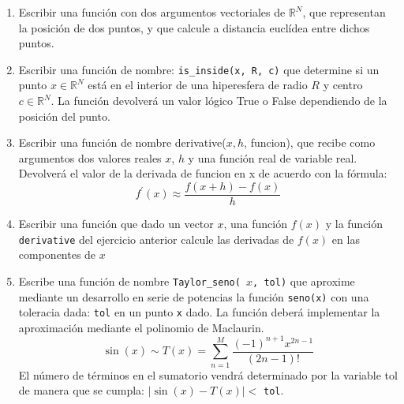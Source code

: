 \documentclass[12pt]{article}
\begin{document}
\begin{enumerate}
\item Escribir una función con dos argumentos vectoriales de $\mathbb{R}^{N}$, que representan la posición 
de dos puntos, y que calcule a distancia euclídea entre dichos puntos.  
	
	
\item Escribir una función de nombre: \texttt{is\_inside(x, R, c)} que determine si un punto $ x \in \mathbb{R}^{N} $ 
está en el interior de una hiperesfera de radio $ R $ y centro $ c \in \mathbb{R}^{N}  $.
La función devolverá un valor lógico True o False dependiendo de la posición del punto.
	
\item Escribir una función de nombre derivative($x, h$, funcion), 
que recibe como argumentos dos valores reales $x$, $h$ y una función real de variable real. 
Devolverá el valor de la derivada de funcion en x de acuerdo con la fórmula:	
	$$
	f^{\prime}(x) \approx \frac{ f(x+h)-f(x) } { h }
	$$
	
	
\item Escribir una función que dado un vector $ x $, una función $ f(x)$ y la función 
\texttt{derivative} del ejercicio anterior calcule las derivadas de $ f(x) $ en las componentes de  $ x $ 

		









\item Escribe una función de nombre \texttt{Taylor\_seno( $x$, tol)} 
que aproxime 
mediante un desarrollo en serie de potencias la función \texttt{seno(x)} 
con una toleracia dada: \texttt{tol} en un punto \texttt{x} dado.  
La función deberá implementar la aproximación mediante el polinomio de Maclaurin.
	$$
 	\sin(x) \sim T(x)=\sum_{n=1}^{M} \frac{(-1)^{n+1} x^{2 n-1}}{(2 n-1) !}
		$$
El número de términos en el sumatorio vendrá determinado 
por la variable tol de manera que se cumpla: $|\sin(x)-T(x)|<$ \texttt{tol}.
	



\end{enumerate}
\end{document}
